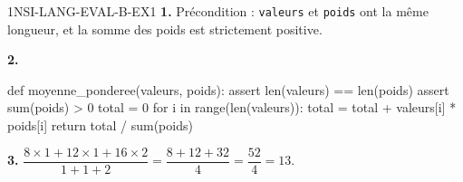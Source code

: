 \begin{corrige}{1NSI-LANG-EVAL-B-EX1}
\textbf{1.} Précondition : \lstinline{valeurs} et \lstinline{poids} ont la même longueur,
et la somme des poids est strictement positive.

\textbf{2.}
\begin{python}
def moyenne_ponderee(valeurs, poids):
    assert len(valeurs) == len(poids)
    assert sum(poids) > 0
    total = 0
    for i in range(len(valeurs)):
        total = total + valeurs[i] * poids[i]
    return total / sum(poids)
\end{python}

\textbf{3.} $\dfrac{8\times1+12\times1+16\times2}{1+1+2}=\dfrac{8+12+32}{4}=\dfrac{52}{4}=13$.
\end{corrige}

